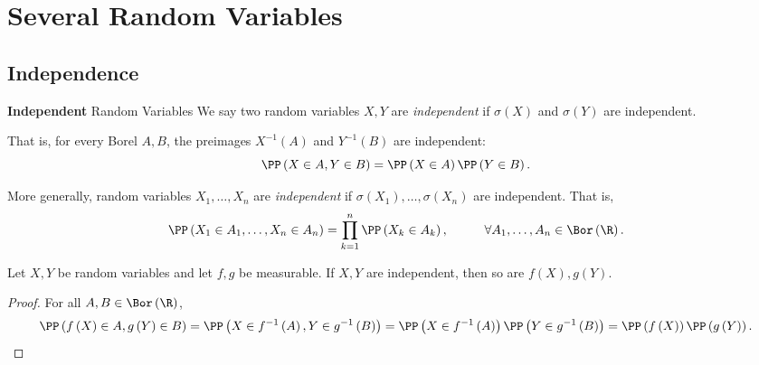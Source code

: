 \documentclass[stat901]{subfiles}
\begin{document}
    \section{Several Random Variables}

    \subsection{Independence}
    
    \begin{definition}{\textbf{Independent} Random Variables}
        We say two random variables $X,Y$ are \emph{independent} if $\sigma\left( X \right)$ and $\sigma\left( Y \right)$ are independent.
    \end{definition}

    \np That is, for every Borel $A,B$, the preimages $X^{-1}\left( A \right)$ and $Y^{-1}\left( B \right)$ are independent:
    \begin{equation*}
        \PP\left( X\in A, Y\in B \right) = \PP\left( X\in A \right)\PP\left( Y\in B \right).
    \end{equation*}
    
    More generally, random variables $X_1,\ldots,X_n$ are \emph{independent} if $\sigma\left( X_1 \right),\ldots,\sigma\left( X_n \right)$ are independent. That is,
    \begin{equation*}
        \PP\left( X_1\in A_1,\ldots,X_n\in A_n \right) = \prod^{n}_{k=1}\PP\left( X_k\in A_k \right), \hspace{1cm}\forall A_1,\ldots,A_n\in\Bor\left( \R \right).
    \end{equation*}
    
    \begin{prop}{}
        Let $X,Y$ be random variables and let $f,g$ be measurable. If $X,Y$ are independent, then so are $f\left( X \right),g\left( Y \right)$.
    \end{prop}

    \begin{proof}
        For all $A,B\in\Bor\left( \R \right)$,
        \begin{equation*}
            \PP\left( f\left( X \right)\in A, g\left( Y \right)\in B \right) = \PP\left( X\in f^{-1}\left( A \right), Y\in g^{-1}\left( B \right) \right) = \PP\left( X\in f^{-1}\left( A \right) \right)\PP\left( Y\in g^{-1}\left( B \right) \right) = \PP\left( f\left( X \right) \right)\PP\left( g\left( Y \right) \right).
        \end{equation*}
    \end{proof}
    
\end{document}
